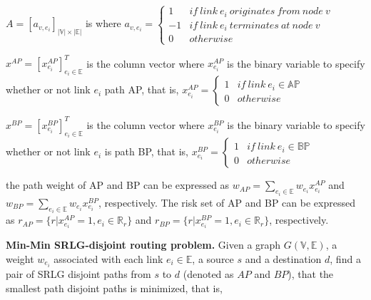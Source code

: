 $A=[a_{v,e_i}]_{|\mathbb{V}|\times |\mathbb{E}|}$ is  
where ${a_{v,e_i}} = \left\{ {\begin{array}{*{20}{c}}
1&{if\ link\ e_i\ originates\ from\ node\ v}\\
{ - 1}&{if\ link\ e_i\ terminates\ at\ node\ v}\\
0&{otherwise}
\end{array}} \right.$


$x^{AP} = [x_{e_i}^{AP}]^T_{e_i\in \mathbb{E}}$ is the column vector  where ${x_{e_i}^{AP}}$ is the binary variable  to specify whether or not link ${e_i}$  path AP, that is,  ${x_{e_i}^{AP}} = \left\{ {\begin{array}{*{20}{c}}
1&{if\ link\ e_i \in \mathbb{AP}}\\
0&{otherwise}
\end{array}} \right.$

$x^{BP}=[x_{e_i}^{BP}]^T_{e_i\in \mathbb{E}}$ is the column vector where ${x_{e_i}^{BP}}$ is the binary variable  to specify whether or not  link ${e_i}$ is  path BP, that is, ${x_{e_i}^{BP}} = \left\{ {\begin{array}{*{20}{c}}
1&{if\ link\ e_i \in \mathbb{BP}}\\
0&{otherwise}
\end{array}} \right.$


 the path weight of AP and BP can be expressed as
$w_{AP}=\sum\limits_{e_i\in \mathbb{E}}w_{e_i}x_{e_i}^{AP}$ and $w_{BP}=\sum\limits_{e_i\in \mathbb{E}}w_{e_i}x_{e_i}^{BP}$, respectively. The  risk set of AP and BP can be expressed as $r_{AP}=\{r|{x_{e_i}^{AP}}=1, e_i \in \mathbb{R}_r\}$ and
$r_{BP}=\{r|{x_{e_i}^{BP}}=1, e_i \in \mathbb{R}_r\}$, respectively. 

\textbf{Min-Min SRLG-disjoint routing problem.} Given a graph $G(\mathbb{V},\mathbb{E})$, a weight $w_{e_i}$ associated with each link $e_i\in \mathbb{E}$, a source  $s$ and a destination  $d$,  find a pair of SRLG disjoint paths from $s$ to $d$ (denoted as $AP$ and $BP$),  that  the smallest path  disjoint paths is minimized, that is,

